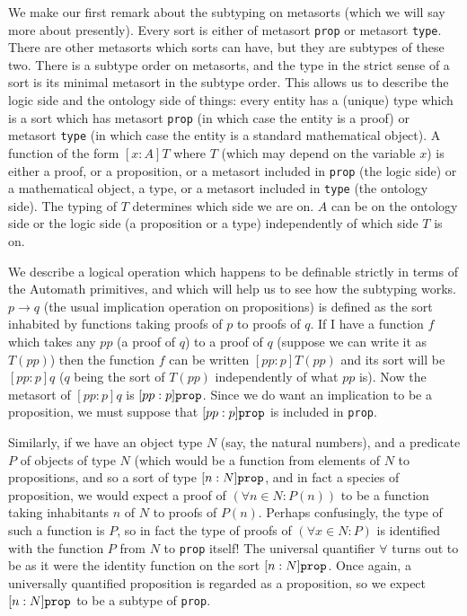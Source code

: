 \documentclass[12pt]{article}
\begin{document}
We make our first remark about the subtyping on metasorts (which we will say more about presently).  Every sort is either of metasort {\tt prop} or metasort {\tt type}.  There
are other metasorts which sorts can have, but they are subtypes of these two.  There is a subtype order on metasorts, and the type in the strict sense of a sort is its minimal metasort in the subtype order.  This allows us to describe the logic side and the ontology side of things:  every entity has a (unique) type which is a sort which has metasort {\tt prop} (in which case the entity is a proof) or metasort {\tt type} (in which case the entity is a standard mathematical object).   A  function of the form $[x:A]T$ where $T$ (which may depend on the variable $x$) is either a proof, or a proposition, or a metasort included in {\tt prop} (the logic side) or a mathematical object, a type, or a metasort included in {\tt type} (the ontology side).
The typing of $T$ determines which side we are on.  $A$ can be on the ontology side or the logic side (a proposition or a type) independently of which side $T$ is on.

We describe a logical operation which happens to be definable strictly in terms of the Automath primitives, and which will help us to see how the subtyping works.
$p \rightarrow q$ (the usual implication operation on propositions) is defined as the sort inhabited by functions taking proofs of $p$ to proofs of $q$.  If I have a function
$f$ which takes any $pp$ (a proof of $q$) to a proof of $q$ (suppose we can write it as $T(pp)$) then the function $f$ can be written $[pp:p]T(pp)$ and its sort will
be $[pp:p]q$ ($q$ being the sort of $T(pp)$ independently of what $pp$ is).  Now the metasort of $[pp:p]q$ is $[pp:p]{\tt prop}$.  Since we do want an implication to be a proposition, we must suppose that $[pp:p]{\tt prop}$ is included in {\tt prop}.

Similarly, if we have an object type $N$ (say, the natural numbers), and a predicate $P$ of objects of type $N$ (which would be a function from elements of $N$ to propositions,
and so a sort  of type $[n:N]{\tt prop}$, and in fact a species of proposition, we would expect a proof of $(\forall n \in N:P(n))$ to be a function taking inhabitants $n$ of $N$ to
proofs of $P(n)$.  Perhaps confusingly, the type of such a function is $P$, so in fact the type of proofs of $(\forall x \in N:P)$ is identified with the function $P$ from $N$ to {\tt prop} itself!  The universal quantifier $\forall$ turns out to be as it were the identity function on the sort $[n:N]{\tt prop}$.  Once again, a universally quantified proposition is regarded as a proposition,
so we expect $[n:N]{\tt prop}$ to be a subtype of {\tt prop}.
\end{document}
